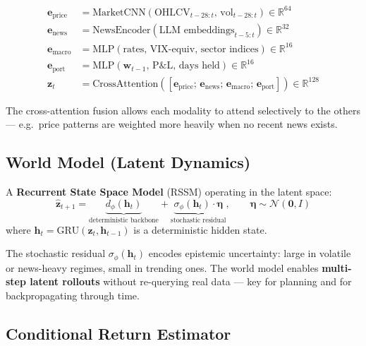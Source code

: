 \documentclass[11pt, a4paper]{article}
\begin{document}
\begin{align*}
  \mathbf{e}_\text{price}  &= \text{MarketCNN}(\text{OHLCV}_{t-28:t},\,
                                                \text{vol}_{t-28:t}) \in \mathbb{R}^{64} \\
  \mathbf{e}_\text{news}   &= \text{NewsEncoder}(\text{LLM embeddings}_{t-5:t}) \in \mathbb{R}^{32} \\
  \mathbf{e}_\text{macro}  &= \text{MLP}(\text{rates, VIX-equiv, sector indices}) \in \mathbb{R}^{16} \\
  \mathbf{e}_\text{port}   &= \text{MLP}(\mathbf{w}_{t-1},\,
                                          \text{P\&L},\, \text{days held}) \in \mathbb{R}^{16} \\[4pt]
  \mathbf{z}_t &= \text{CrossAttention}\!\left(
    [\mathbf{e}_\text{price};\,\mathbf{e}_\text{news};\,
     \mathbf{e}_\text{macro};\,\mathbf{e}_\text{port}]
  \right) \in \mathbb{R}^{128}
\end{align*}

The cross-attention fusion allows each modality to attend selectively to the
others — e.g.\ price patterns are weighted more heavily when no recent news
exists.

\subsection{World Model (Latent Dynamics)}

A \textbf{Recurrent State Space Model} (RSSM) operating in the latent space:
\begin{equation}\label{eq:rssm}
  \hat{\mathbf{z}}_{t+1} = \underbrace{d_\phi(\mathbf{h}_t)}_{\text{deterministic backbone}}
  + \underbrace{\sigma_\phi(\mathbf{h}_t) \cdot \boldsymbol{\eta}}_{\text{stochastic residual}},
  \qquad \boldsymbol{\eta} \sim \mathcal{N}(\mathbf{0}, I)
\end{equation}
where $\mathbf{h}_t = \text{GRU}(\mathbf{z}_t, \mathbf{h}_{t-1})$ is a
deterministic hidden state.

The stochastic residual $\sigma_\phi(\mathbf{h}_t)$ encodes epistemic
uncertainty: large in volatile or news-heavy regimes, small in trending ones.
The world model enables \textbf{multi-step latent rollouts} without re-querying
real data — key for planning and for backpropagating through time.

\subsection{Conditional Return Estimator}
\end{document}
